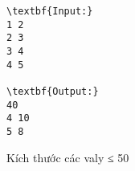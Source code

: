 \begin{verbatim}
\textbf{Input:}
1 2
2 3
3 4
4 5

\textbf{Output:}
40
4 10
5 8\end{verbatim}

Kích thước các valy ≤ 50